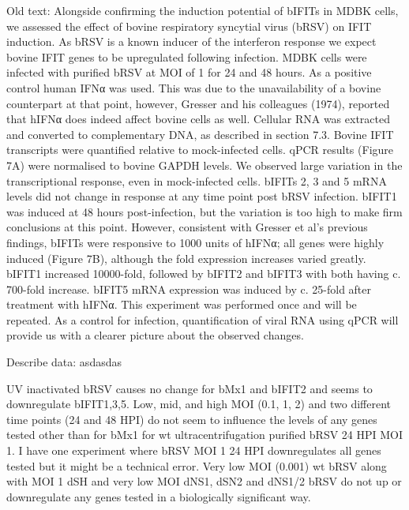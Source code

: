 Old text:
Alongside confirming the induction potential of bIFITs in MDBK cells, we assessed the effect of bovine respiratory syncytial virus (bRSV) on IFIT induction. As bRSV is a known inducer of the interferon response we expect bovine IFIT genes to be upregulated following infection. MDBK cells were infected with purified bRSV at MOI of 1 for 24 and 48 hours. As a positive control human IFNα was used. This was due to the unavailability of a bovine counterpart at that point, however, Gresser and his colleagues (1974), reported that hIFNα does indeed affect bovine cells as well. Cellular RNA was extracted and converted to complementary DNA, as described in section 7.3. Bovine IFIT transcripts were quantified relative to mock-infected cells. qPCR results (Figure 7A) were normalised to bovine GAPDH levels. We observed large variation in the transcriptional response, even in mock-infected cells. bIFITs 2, 3 and 5 mRNA levels did not change in response at any time point post bRSV infection. bIFIT1 was induced at 48 hours post-infection, but the variation is too high to make firm conclusions at this point. However, consistent with Gresser et al’s previous findings, bIFITs were responsive to 1000 units of hIFNα; all genes were highly induced (Figure 7B), although the fold expression increases varied greatly. bIFIT1 increased 10000-fold, followed by bIFIT2 and bIFIT3 with both having c. 700-fold increase. bIFIT5 mRNA expression was induced by c. 25-fold after treatment with hIFNα. This experiment was performed once and will be repeated. As a control for infection, quantification of viral RNA using qPCR will provide us with a clearer picture about the observed changes.

Describe data: \newline
asdasdas

UV inactivated bRSV causes no change for bMx1 and bIFIT2 and seems to downregulate bIFIT1,3,5. Low, mid, and high MOI (0.1, 1, 2) and two different time points (24 and 48 HPI) do not seem to influence the levels of any genes tested other than for bMx1 for wt ultracentrifugation purified bRSV 24 HPI MOI 1. I have one experiment where bRSV MOI 1 24 HPI downregulates all genes tested but it might be a technical error. 
Very low MOI (0.001) wt bRSV along with MOI 1 dSH and very low MOI dNS1, dSN2 and dNS1/2 bRSV do not up or downregulate any genes tested in a biologically significant way.

